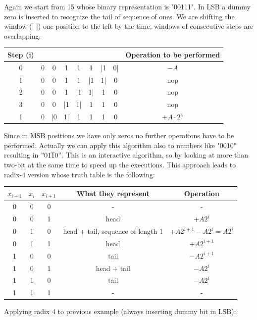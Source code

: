 Again we start from 15 whose binary representation is "00111". In LSB a dummy zero is inserted to recognize the tail of sequence of ones. We are shifting the window (| |) one position to the left by the time, windows of consecutive steps are overlapping.
\begin{center}
\begin{tabular}{|c|c|c|c|c|c|c|c|c|}
  \hline
  Step (i)& & & & & & & & Operation to be performed\\
  \hline
    0&    0&    0&  1&  1&  1&  |1& 0|&   $-A$\\
    1&    0&    0&  1&  1&  |1&  1|&  0&    nop\\
    2&    0&    0&  1&  |1&   1|&  1& 0&    nop\\
    3&    0&    0&  |1& 1|&   1&   1& 0&    nop\\
    1&    0&    |0& 1|& 1&    1&   1& 0&    $+A \cdot 2^4$\\
  \hline
\end{tabular}
\end{center}
Since in MSB positions we have only zeros no further operations have to be performed. Actually we can apply this algorithm also to numbers like "0010" resulting in $"01\overline{1}0"$. This is an interactive algorithm, so by looking at more than two-bit at the same time to speed up the executions. This approach leads to radix-4 version whose truth table is the following:
\begin{center}
\begin{tabular}{|c|c|c|c|c|}
  \hline
  $x_{i+1}$&    $x_i$&  $x_{i+1}$&  What they represent& Operation\\
  \hline
  0&        0&    0&      -&          -\\
  0&        0&    1&      head& $+A2^i$\\
  0&        1&    0&      head + tail, sequence of length 1&   $+A2^{i+1}-A2^i=A2^i$\\
  0&        1&    1&      head&  $+A2^{i+1}$\\
  1&        0&    0&      tail&  $-A2^{i+1}$\\
  1&        0&    1&      head + tail&  $-A2^i$\\
  1&        1&    0&      tail&  $-A2^i$\\
  1&        1&    1&      -& -\\
  \hline
\end{tabular}
\end{center}
Applying radix 4 to previous example (always inserting dummy bit in LSB):
